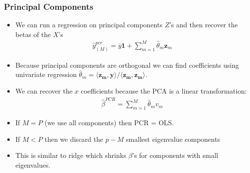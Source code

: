 \begin{frame}
\frametitle{Principal Components}
\vspace{-10pt}
\begin{itemize}
\item We can run a regression on principal components $Z$'s and then recover the betas of the $X$'s
\begin{eqnarray*}
\hat{y}_{(M)}^{pcr} = \overline{y} \mathbf{1} + \sum_{m=1}^M \hat{\theta}_m \mathbf{z}_m
\end{eqnarray*}
\item Because principal components are orthogonal we can find coefficients using univariate regression $\hat{\theta}_m = \langle \mathbf{z_m} , \mathbf{y} \rangle / \langle \mathbf{z_m} , \mathbf{z_m} \rangle$.
\item We can recover the $x$ coefficients because the PCA is a linear transformation:
\begin{eqnarray*}
\hat{\beta}^{PCR} = \sum_{m=1}^M \hat{\theta}_m v_m
\end{eqnarray*}
\item If $M=P$ (we use all components) then PCR = OLS.
\item If $M < P$ then we discard the $p-M$ smallest eigenvalue components
\item This is similar to ridge which shrinks $\beta$'s for components with small eigenvalues.
\end{itemize}
\end{frame}



